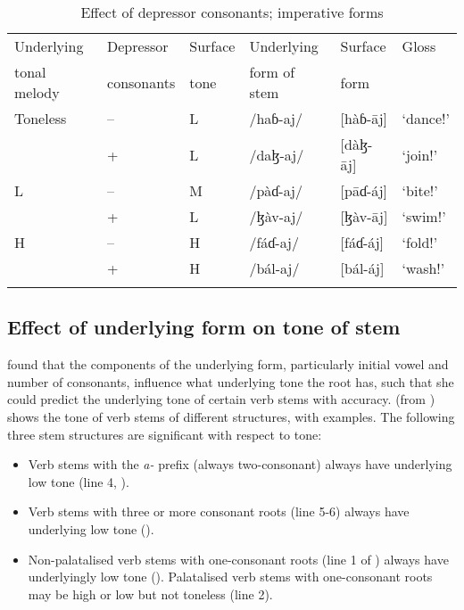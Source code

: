 \begin{table}
\begin{tabular}{llllll}
\lsptoprule
{Underlying } & {Depressor} & {Surface } & {Underlying } & {Surface } & {Gloss}\\
{tonal melody} & {consonants} & {tone} & {form of stem} & {form} &\\\midrule
Toneless & -- & L & /haɓ-aj/ & [hàɓ-\={a}j] & ‘dance!’\\
& + & L & /daɮ-aj/ & [dàɮ-\={a}j] & ‘join!’\\\midrule
L & -- & M & /pàɗ-aj/ & [p\={a}ɗ-áj] & ‘bite!’\\
& + & L & /ɮàv-aj/ & [ɮàv-\={a}j] & ‘swim!’\\\midrule
H & -- & H & /fáɗ-aj/ & [fáɗ-áj] & ‘fold!’\\
& + & H & /bál-aj/ & [bál-áj] & ‘wash!’\\
\lspbottomrule
\end{tabular}
\caption{Effect of depressor consonants; imperative forms\label{tab:47}}
\end{table}

\subsection{  Effect of underlying form on tone of stem}\label{sec:6.7.2}
\hypertarget{RefHeading1212061525720847}{}
\largerpage \citet{Bow1997c} found that the components of the underlying form, particularly initial vowel and number of consonants, influence what underlying tone the root has, such that she could predict the underlying tone of certain verb stems with accuracy.  (from \citealt{FriesenMamalis2008}) shows the tone of verb stems of different structures, with examples. The following three stem structures are significant with respect to tone:


\begin{itemize}
\item Verb stems with the \textit{a-} prefix (always two-consonant) always have underlying low tone (line 4, ). 
\item Verb stems with three or more consonant roots (line 5-6) always have underlying low tone (). 
\item Non-palatalised verb stems with one-consonant roots (line 1 of ) always have underlyingly low tone (). Palatalised verb stems with one-consonant roots may be high or low but not toneless (line 2). 
\end{itemize}

